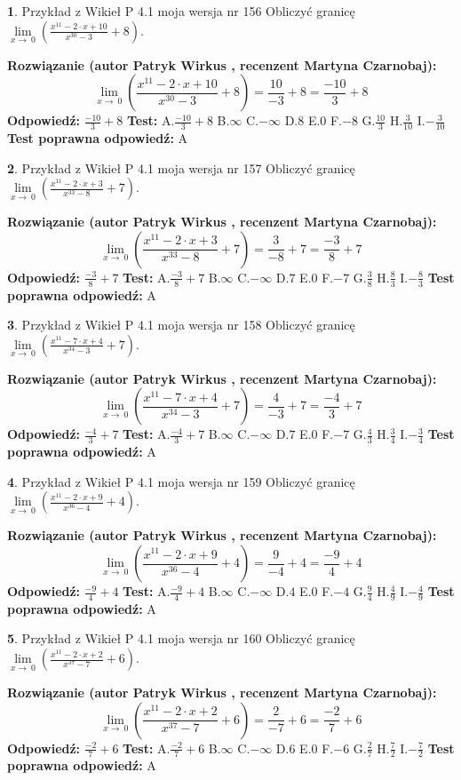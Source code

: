 \documentclass[12pt, a4paper]{article}
\theoremstyle{definition} %
\newtheorem{zad}{}
\newcommand{\zadStart}[1]{\begin{zad}#1\newline}
\newcommand{\zadStop}{\end{zad}}
\newcommand{\rozwStart}[2]{\noindent \textbf{Rozwiązanie (autor #1 , recenzent #2): }\newline}
\newcommand{\rozwStop}{\newline}
\newcommand{\odpStart}{\noindent \textbf{Odpowiedź:}\newline}
\newcommand{\odpStop}{\newline}
\newcommand{\testStart}{\noindent \textbf{Test:}\newline}
\newcommand{\testStop}{\newline}
\newcommand{\kluczStart}{\noindent \textbf{Test poprawna odpowiedź:}\newline}
\newcommand{\kluczStop}{\newline}
\begin{document}
\zadStart{Przykład z Wikieł P 4.1 moja wersja nr 156}
Obliczyć granicę $\lim\limits_{x\to\ 0}(\frac{x^{11}-2 \cdot x +10}{x^{30}-3}+8)$.
\zadStop
\rozwStart{Patryk Wirkus}{Martyna Czarnobaj}
$$\lim\limits_{x\to\ 0}(\frac{x^{11}-2 \cdot x +10}{x^{30}-3}+8)=\frac{10}{-3}+8=\frac{-10}{3}+8$$
\rozwStop
\odpStart
$\frac{-10}{3}+8$
\odpStop
\testStart
A.$\frac{-10}{3}+8$
B.$\infty$
C.$-\infty$
D.$8$
E.$0$
F.$-8$
G.$\frac{10}{3}$
H.$\frac{3}{10}$
I.$-\frac{3}{10}$
\testStop
\kluczStart
A
\kluczStop



\zadStart{Przykład z Wikieł P 4.1 moja wersja nr 157}
Obliczyć granicę $\lim\limits_{x\to\ 0}(\frac{x^{11}-2 \cdot x +3}{x^{33}-8}+7)$.
\zadStop
\rozwStart{Patryk Wirkus}{Martyna Czarnobaj}
$$\lim\limits_{x\to\ 0}(\frac{x^{11}-2 \cdot x +3}{x^{33}-8}+7)=\frac{3}{-8}+7=\frac{-3}{8}+7$$
\rozwStop
\odpStart
$\frac{-3}{8}+7$
\odpStop
\testStart
A.$\frac{-3}{8}+7$
B.$\infty$
C.$-\infty$
D.$7$
E.$0$
F.$-7$
G.$\frac{3}{8}$
H.$\frac{8}{3}$
I.$-\frac{8}{3}$
\testStop
\kluczStart
A
\kluczStop



\zadStart{Przykład z Wikieł P 4.1 moja wersja nr 158}
Obliczyć granicę $\lim\limits_{x\to\ 0}(\frac{x^{11}-7 \cdot x +4}{x^{34}-3}+7)$.
\zadStop
\rozwStart{Patryk Wirkus}{Martyna Czarnobaj}
$$\lim\limits_{x\to\ 0}(\frac{x^{11}-7 \cdot x +4}{x^{34}-3}+7)=\frac{4}{-3}+7=\frac{-4}{3}+7$$
\rozwStop
\odpStart
$\frac{-4}{3}+7$
\odpStop
\testStart
A.$\frac{-4}{3}+7$
B.$\infty$
C.$-\infty$
D.$7$
E.$0$
F.$-7$
G.$\frac{4}{3}$
H.$\frac{3}{4}$
I.$-\frac{3}{4}$
\testStop
\kluczStart
A
\kluczStop



\zadStart{Przykład z Wikieł P 4.1 moja wersja nr 159}
Obliczyć granicę $\lim\limits_{x\to\ 0}(\frac{x^{11}-2 \cdot x +9}{x^{36}-4}+4)$.
\zadStop
\rozwStart{Patryk Wirkus}{Martyna Czarnobaj}
$$\lim\limits_{x\to\ 0}(\frac{x^{11}-2 \cdot x +9}{x^{36}-4}+4)=\frac{9}{-4}+4=\frac{-9}{4}+4$$
\rozwStop
\odpStart
$\frac{-9}{4}+4$
\odpStop
\testStart
A.$\frac{-9}{4}+4$
B.$\infty$
C.$-\infty$
D.$4$
E.$0$
F.$-4$
G.$\frac{9}{4}$
H.$\frac{4}{9}$
I.$-\frac{4}{9}$
\testStop
\kluczStart
A
\kluczStop



\zadStart{Przykład z Wikieł P 4.1 moja wersja nr 160}
Obliczyć granicę $\lim\limits_{x\to\ 0}(\frac{x^{11}-2 \cdot x +2}{x^{37}-7}+6)$.
\zadStop
\rozwStart{Patryk Wirkus}{Martyna Czarnobaj}
$$\lim\limits_{x\to\ 0}(\frac{x^{11}-2 \cdot x +2}{x^{37}-7}+6)=\frac{2}{-7}+6=\frac{-2}{7}+6$$
\rozwStop
\odpStart
$\frac{-2}{7}+6$
\odpStop
\testStart
A.$\frac{-2}{7}+6$
B.$\infty$
C.$-\infty$
D.$6$
E.$0$
F.$-6$
G.$\frac{2}{7}$
H.$\frac{7}{2}$
I.$-\frac{7}{2}$
\testStop
\kluczStart
A
\kluczStop
\end{document}

